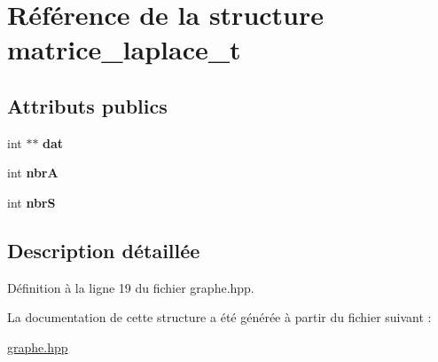 \hypertarget{structmatrice__laplace__t}{\section{Référence de la structure matrice\+\_\+laplace\+\_\+t}
\label{structmatrice__laplace__t}
}
\subsection*{Attributs publics}
\begin{DoxyCompactItemize}
\item 
\hypertarget{structmatrice__laplace__t_a3f58ff72f8d8e5b8f154e369916d7d08}{int $\ast$$\ast$ {\bfseries dat}}\label{structmatrice__laplace__t_a3f58ff72f8d8e5b8f154e369916d7d08}

\item 
\hypertarget{structmatrice__laplace__t_aa88d77ffa32b29613bf571afe3ea03e0}{int {\bfseries nbr\+A}}\label{structmatrice__laplace__t_aa88d77ffa32b29613bf571afe3ea03e0}

\item 
\hypertarget{structmatrice__laplace__t_a93d1312a981c2f318811735736d3d85c}{int {\bfseries nbr\+S}}\label{structmatrice__laplace__t_a93d1312a981c2f318811735736d3d85c}

\end{DoxyCompactItemize}


\subsection{Description détaillée}


Définition à la ligne 19 du fichier graphe.\+hpp.



La documentation de cette structure a été générée à partir du fichier suivant \+:\begin{DoxyCompactItemize}
\item 
\hyperlink{graphe_8hpp}{graphe.\+hpp}\end{DoxyCompactItemize}
